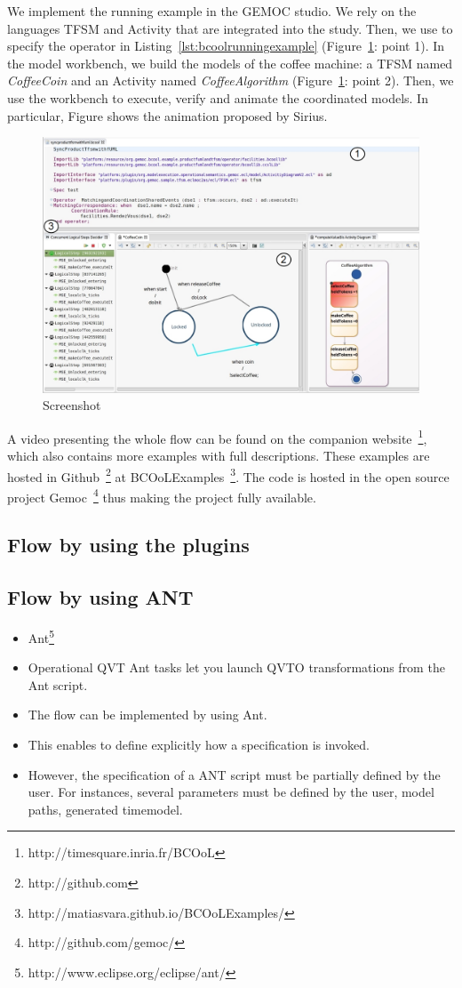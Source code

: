 We implement the running example in the GEMOC studio. We rely on the languages TFSM and Activity that are integrated into the study. Then, we use \bcool to specify the operator in Listing~\ref{lst:bcoolrunningexample} (Figure~\ref{fig:screenbcool}: point 1). In the model workbench, we build the models of the coffee machine: a TFSM named \emph{CoffeeCoin} and an Activity named \emph{CoffeeAlgorithm} (Figure~\ref{fig:screenbcool}: point 2). Then, we use the workbench to execute, verify and animate the coordinated models. In particular, Figure shows the animation proposed by Sirius.   

\begin{figure}[h]
	\begin{center}
		\includegraphics[width=.6\textwidth]{bcool/figs/bcoolscreen.png}
		\caption{Screenshot}
		\label{fig:screenbcool}
	\end{center}
\end{figure}

A video presenting the whole flow can be found on the companion website~\footnote{http://timesquare.inria.fr/BCOoL}, which also contains more examples with full descriptions. These examples are hosted in Github~\footnote{http://github.com} at BCOoLExamples~\footnote{http://matiasvara.github.io/BCOoLExamples/}. The \bcool code is hosted in the open source project Gemoc~\footnote{http://github.com/gemoc/} thus making the project fully available.

\subsection{Flow by using the plugins}
\subsection{Flow by using ANT}
	\begin{itemize}
		\item Ant\footnote{http://www.eclipse.org/eclipse/ant/}
		\item Operational QVT Ant tasks let you launch QVTO transformations from the Ant script.
		\item The flow can be implemented by using Ant.
		\item This enables to define explicitly how a \bcool specification is invoked. 
		\item However, the specification of a ANT script must be partially defined by the user. For instances, several parameters must be defined by the user, \eg model paths, generated timemodel. 
		  
	\end{itemize}


